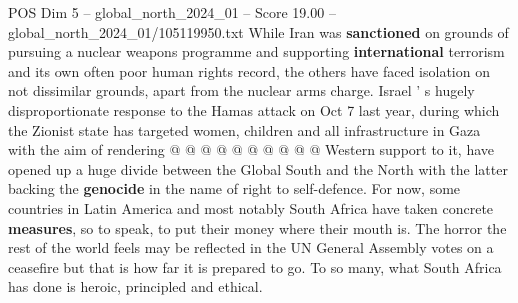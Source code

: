 \begin{textsample}{POS Dim 5 – global\_north\_2024\_01 – Score 19.00 – global\_north\_2024\_01/105119950.txt}
While Iran was \textbf{sanctioned} on grounds of pursuing a nuclear weapons programme and supporting \textbf{international} terrorism and its own often poor human rights record, the others have faced isolation on not dissimilar grounds, apart from the nuclear arms charge.
Israel ' s hugely disproportionate response to the Hamas attack on Oct 7 last year, during which the Zionist state has targeted women, children and all infrastructure in Gaza with the aim of rendering @ @ @ @ @ @ @ @ @ @ Western support to it, have opened up a huge divide between the Global South and the North with the latter backing the \textbf{genocide} in the name of right to self-defence.
For now, some countries in Latin America and most notably South Africa have taken concrete \textbf{measures}, so to speak, to put their money where their mouth is.
The horror the rest of the world feels may be reflected in the UN General Assembly votes on a ceasefire but that is how far it is prepared to go.
To so many, what South Africa has done is heroic, principled and ethical.

\end{textsample}
